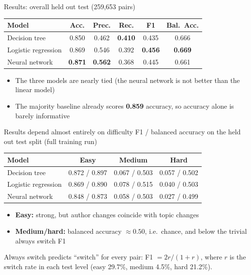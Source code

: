 \documentclass[aspectratio=169,11pt]{beamer}
\begin{document}
\begin{frame}{Results: overall held out test (259,653 pairs)}
\centering\small
\begin{tabular}{lccccc}
\toprule
\textbf{Model} & \textbf{Acc.} & \textbf{Prec.} & \textbf{Rec.} & \textbf{F1} & \textbf{Bal.\ Acc.}\\
\midrule
Decision tree & 0.850 & 0.462 & \textbf{0.410} & 0.435 & 0.666\\
Logistic regression & 0.869 & 0.546 & 0.392 & \textbf{0.456} & \textbf{0.669}\\
Neural network & \textbf{0.871} & \textbf{0.562} & 0.368 & 0.445 & 0.661\\
\bottomrule
\end{tabular}
\bigskip

\raggedright
\begin{itemize}\itemsep0.4em
\item The three models are nearly tied (the neural network is not better than the linear model)
\item The majority baseline already scores \textbf{0.859} accuracy, so accuracy alone is barely informative
\end{itemize}
\end{frame}

\begin{frame}{Results depend almost entirely on difficulty}
\centering\small
F1 / balanced accuracy on the held out test split (full training run)\\[0.5em]
\begin{tabular}{lccc}
\toprule
\textbf{Model} & \textbf{Easy} & \textbf{Medium} & \textbf{Hard}\\
\midrule
Decision tree & 0.872 / 0.897 & 0.067 / 0.503 & 0.057 / 0.502\\
Logistic regression & 0.869 / 0.890 & 0.078 / 0.515 & 0.040 / 0.503\\
Neural network & 0.848 / 0.873 & 0.058 / 0.503 & 0.027 / 0.499\\
\midrule
\bottomrule
\end{tabular}
\bigskip

\raggedright
\begin{itemize}\itemsep0.4em
\item \textcolor{good}{\textbf{Easy:}} strong, but author changes coincide with topic changes
\item \textcolor{bad}{\textbf{Medium/hard:}} balanced accuracy $\approx 0.50$, i.e.\ chance, and below the trivial always switch F1
\end{itemize}
\vfill
\raggedright\footnotesize Always switch predicts ``switch'' for every pair: F1 $=2r/(1+r)$, where $r$ is the switch rate in each test level (easy 29.7\%, medium 4.5\%, hard 21.2\%).
\end{frame}
\end{document}
